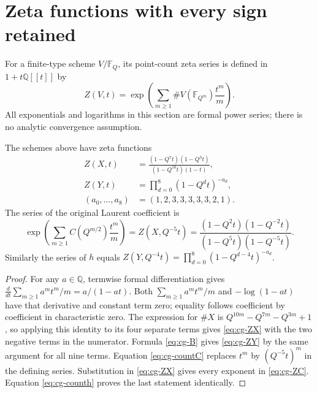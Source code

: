 \section{Zeta functions with every sign retained}
\label{sec:cg-zeta}
For a finite-type scheme $V/\mathbb F_Q$, its point-count zeta series is
defined in $1+t\mathbb Q[[t]]$ by
\[
 Z(V,t)=\exp\left(\sum_{m\geq1}\#V(\mathbb F_{Q^m})\frac{t^m}{m}\right).
\]
All exponentials and logarithms in this section are formal power series;
there is no analytic convergence assumption.

\begin{theorem}\label{thm:cg-zeta}
The schemes above have zeta functions
\begin{align}
 Z(X,t)&=\frac{(1-Q^7t)(1-Q^3t)}{(1-Q^{10}t)(1-t)},\label{eq:cg-ZX}\\
 Z(Y,t)&=\prod_{d=0}^8(1-Q^dt)^{-a_d},\label{eq:cg-ZY}\\
 (a_0,\ldots,a_8)&=(1,2,3,3,3,3,3,2,1).
\end{align}
The series of the original Laurent coefficient is
\begin{equation}\label{eq:cg-ZC}
 \exp\left(\sum_{m\geq1}C(Q^{m/2})\frac{t^m}{m}\right)
 =Z(X,Q^{-5}t)
 =\frac{(1-Q^2t)(1-Q^{-2}t)}{(1-Q^5t)(1-Q^{-5}t)}.
\end{equation}
Similarly the series of $h$ equals
$Z(Y,Q^{-4}t)=\prod_{d=0}^8(1-Q^{d-4}t)^{-a_d}$.
\end{theorem}
\begin{proof}
For any $a\in\mathbb Q$, termwise formal differentiation gives
$\frac{d}{dt}\sum_{m\geq1}a^mt^m/m=a/(1-at)$. Both
$\sum_{m\geq1}a^mt^m/m$ and $-\log(1-at)$ have that derivative
and constant term zero; equality follows coefficient by coefficient
in characteristic zero. The expression for $\#X$ is
$Q^{10m}-Q^{7m}-Q^{3m}+1$, so applying this identity to its four
separate terms gives \eqref{eq:cg-ZX} with the two negative terms
in the numerator. Formula \eqref{eq:cg-B} gives \eqref{eq:cg-ZY}
by the same argument for all nine terms. Equation \eqref{eq:cg-countC}
replaces $t^m$ by $(Q^{-5}t)^m$ in the defining series. Substitution
in \eqref{eq:cg-ZX} gives every exponent in \eqref{eq:cg-ZC}.
Equation \eqref{eq:cg-counth} proves the last statement identically.
\end{proof}

